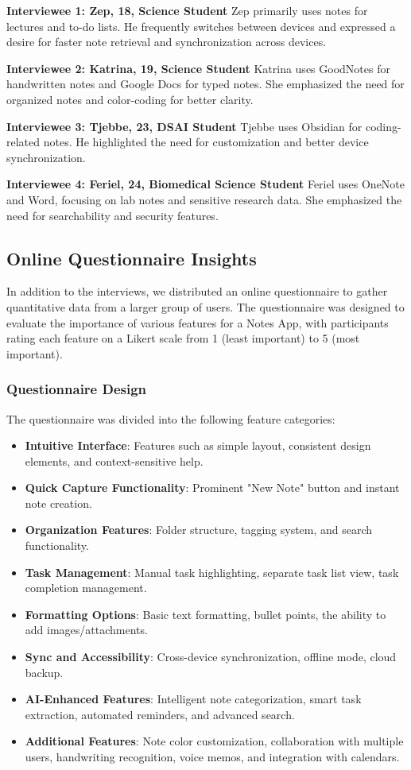 \documentclass[a4paper, 12pt]{article}
\begin{document}
\textbf{Interviewee 1: Zep, 18, Science Student}  
Zep primarily uses notes for lectures and to-do lists. He frequently switches between devices and expressed a desire for faster note retrieval and synchronization across devices.

\textbf{Interviewee 2: Katrina, 19, Science Student}  
Katrina uses GoodNotes for handwritten notes and Google Docs for typed notes. She emphasized the need for organized notes and color-coding for better clarity.

\textbf{Interviewee 3: Tjebbe, 23, DSAI Student}  
Tjebbe uses Obsidian for coding-related notes. He highlighted the need for customization and better device synchronization.

\textbf{Interviewee 4: Feriel, 24, Biomedical Science Student}  
Feriel uses OneNote and Word, focusing on lab notes and sensitive research data. She emphasized the need for searchability and security features.

\subsection{Online Questionnaire Insights}
In addition to the interviews, we distributed an online questionnaire to gather quantitative data from a larger group of users. The questionnaire was designed to evaluate the importance of various features for a Notes App, with participants rating each feature on a Likert scale from 1 (least important) to 5 (most important). 

\subsubsection{Questionnaire Design}
The questionnaire was divided into the following feature categories:
\begin{itemize}
    \item \textbf{Intuitive Interface}: Features such as simple layout, consistent design elements, and context-sensitive help.
    \item \textbf{Quick Capture Functionality}: Prominent "New Note" button and instant note creation.
    \item \textbf{Organization Features}: Folder structure, tagging system, and search functionality.
    \item \textbf{Task Management}: Manual task highlighting, separate task list view, task completion management.
    \item \textbf{Formatting Options}: Basic text formatting, bullet points, the ability to add images/attachments.
    \item \textbf{Sync and Accessibility}: Cross-device synchronization, offline mode, cloud backup.
    \item \textbf{AI-Enhanced Features}: Intelligent note categorization, smart task extraction, automated reminders, and advanced search.
    \item \textbf{Additional Features}: Note color customization, collaboration with multiple users, handwriting recognition, voice memos, and integration with calendars.
\end{itemize}
\end{document}
